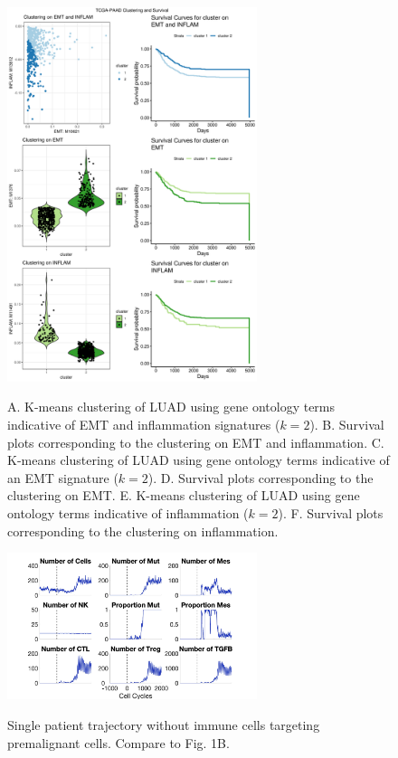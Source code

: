 \documentclass[11pt, a4paper, preprint]{article}
\begin{document}
\begin{figure}
\center
{\includegraphics[width=0.65\textwidth]{../Figs/Figure6/LUAD.pdf}}
\caption{A. K-means clustering of LUAD using gene ontology terms indicative of EMT and inflammation signatures ($k=2$).
B. Survival plots corresponding to the clustering on EMT and inflammation.
C. K-means clustering of LUAD using gene ontology terms indicative of an EMT signature ($k=2$).
D. Survival plots corresponding to the clustering on EMT.
E. K-means clustering of LUAD using gene ontology terms indicative of inflammation ($k=2$).
F. Survival plots corresponding to the clustering on inflammation.}
\label{fig:LUAD}
\end{figure}

\begin{figure}
\center
{\includegraphics[width=0.65\textwidth]{../Figs/Figure1/SinglePatientBlue.jpg}}
\caption{
Single patient trajectory without immune cells targeting premalignant cells. Compare to Fig. 1B.
}
\label{fig:1b_first}
\end{figure}
\end{document}
